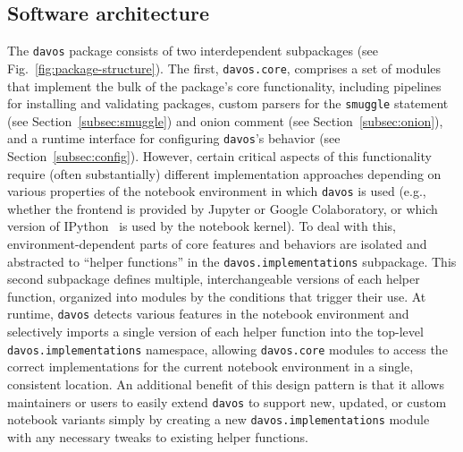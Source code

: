 \documentclass[preprint,12pt,a4paper]{elsarticle}
\newcommand{\comment}[1]{}
\begin{document}
\subsection{Software architecture}
The \texttt{davos} package consists of two interdependent subpackages (see Fig.~\ref{fig:package-structure}). The first, \texttt{davos.core}, comprises a set of modules that implement\comment{provide?} the bulk of the package's core functionality, including pipelines for installing and validating packages, custom parsers for the \texttt{smuggle} statement (see Section~\ref{subsec:smuggle}) and onion comment (see Section~\ref{subsec:onion}), and a runtime interface for configuring \texttt{davos}'s behavior (see Section~\ref{subsec:config}). However, certain critical\comment{other important} aspects of this functionality require (often substantially) different implementation approaches depending on various properties of the notebook environment in which \texttt{davos} is used (e.g., whether the frontend is provided by Jupyter or Google Colaboratory, or which version of IPython~\cite{PereGran07} is used by the notebook kernel). To deal with this, environment-dependent parts of core features and behaviors are isolated and abstracted to ``helper functions'' in the \texttt{davos.implementations} subpackage. This second subpackage defines multiple, interchangeable versions of each helper function, organized into modules by the conditions that trigger their use. At runtime, \texttt{davos} detects various features in the notebook environment and selectively imports a single version of each helper function into the top-level \texttt{davos.implementations} namespace, allowing \texttt{davos.core} modules to access the correct implementations for the current notebook environment in a single, consistent location. An additional benefit of this design pattern is that it allows maintainers or users to easily extend \texttt{davos} to support new, updated, or custom notebook variants simply by creating a new \texttt{davos.implementations} module with any necessary tweaks to existing helper functions.


\comment{
- js_functions.py?
- how parser is registered and deregistered?
- stub files?
- test suite?
- packaged with new PEP \_\_\_ standard (pyproject.toml + setup.cfg; no setup.py)?
}
\end{document}

